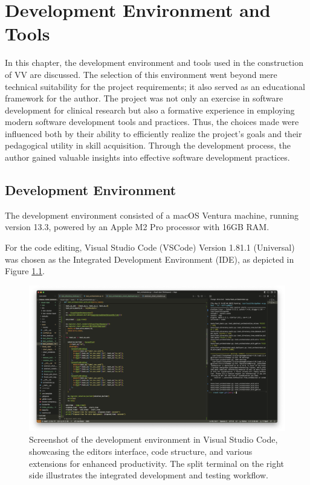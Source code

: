 \chapter{Development Environment and
Tools}\label{development-environment-and-tools}

\minitoc

In this chapter, the development environment and tools used in the
construction of VV are discussed. The selection of this environment went
beyond mere technical suitability for the project requirements; it also
served as an educational framework for the author. The project was not
only an exercise in software development for clinical research but also
a formative experience in employing modern software development tools
and practices. Thus, the choices made were influenced both by their
ability to efficiently realize the project's goals and their pedagogical
utility in skill acquisition. Through the development process, the
author gained valuable insights into effective software development
practices.

\section{Development Environment}\label{development-environment}

The development environment consisted of a macOS Ventura machine,
running version 13.3, powered by an Apple M2 Pro processor with 16GB
RAM.

For the code editing, Visual Studio Code (VSCode) Version 1.81.1
(Universal) was chosen as the Integrated Development Environment (IDE),
as depicted in Figure \ref{fig:vsc}.

\begin{figure}[ht]
  \centering
  \includegraphics[width=\textwidth]{media/fig2.png}
  \caption{Screenshot of the development environment in Visual Studio
  Code, showcasing the editor\textquotesingle s interface, code structure,
  and various extensions for enhanced productivity. The split terminal on
  the right side illustrates the integrated development and testing
  workflow.}
  \label{fig:vsc}
\end{figure}

